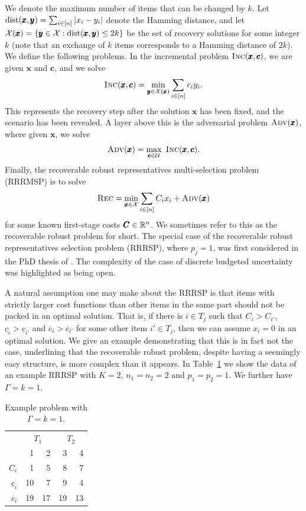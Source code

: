 We denote the maximum number of items that can be changed by $k$.
Let $\operatorname{\text{dist}}(\pmb{x},\pmb{y}) = \sum_{i\in[n]} |x_i-y_i|$ denote the Hamming distance, and let $\mathcal{X}(\pmb{x}) = \{ \pmb{y}\in\mathcal{X} : \operatorname{\text{dist}}(\pmb{x},\pmb{y})\le 2k\}$ be the set of recovery solutions for some integer $k$ (note that an exchange of $k$ items corresponds to a Hamming distance of $2k$).
We define the following problems. In the incremental problem $\textsc{Inc}(\pmb{x},\pmb{c})$, we are given $\pmb{x}$ and $\pmb{c}$, and we solve
\[ \textsc{Inc}(\pmb{x},\pmb{c}) = \min_{\pmb{y}\in \mathcal{X}(\pmb{x})} \sum_{i\in[n]} c_i y_i. \]
This represents the recovery step after the solution $\pmb{x}$ has been fixed, and the scenario has been revealed. A layer above this is the adversarial problem {$\textsc{Adv}(\pmb{x})$}, where given $\pmb{x}$, we solve
\[ \textsc{Adv}(\pmb{x}) = \max_{\pmb{c}\in\mathcal{U}}\ \textsc{Inc}(\pmb{x},\pmb{c}). \]
Finally, the recoverable robust representatives multi-selection problem (RRRMSP) is to solve
\[ \textsc{Rec} = \min_{\pmb{x}\in\mathcal{X}} \sum_{i\in[n]} C_ix_i + \textsc{Adv}(\pmb{x}) \]
for some known first-stage costs $\pmb{C}\in\mathbb{R}^n$.
We sometimes refer to this as the recoverable robust problem for short. The special case of the recoverable robust representatives selection problem (RRRSP), where $p_j=1$,  was first considered in the PhD thesis of \cite{busing2011phd}. The complexity of the case of discrete budgeted uncertainty was highlighted as being open.


A natural assumption one may make about the RRRSP is that items with strictly larger cost functions than other items in the same part should not be packed in an optimal solution. That is, if there is $i\in T_j$ such that $C_i > C_{i'}$, $\underline{c}_i > \underline{c}_{i'}$ and $\overline{c}_i > \overline{c}_{i'}$ for some other item $i'\in T_j$, then we can assume $x_i=0$ in an optimal solution. We give an example demonstrating that this is in fact not the case, underlining that the recoverable robust problem, despite having a seemingly easy structure, is more complex than it appears.
In Table~\ref{tab:example} we show the data of an example RRRSP with $K=2$, $n_1 = n_2 = 2$ and $p_1 = p_2 = 1$. We further have $\Gamma=k=1$. 

\begin{table}[htb]
\begin{center}
\begin{tabular}{r|rr|rr}
 & \multicolumn{2}{c|}{$T_1$} & \multicolumn{2}{c}{$T_2$} \\
 & 1 & 2 & 3 & 4 \\
 \hline
$C_i$ & 1 & 5 & 8 & 7 \\
$\underline{c}_i$ & 10 & 7 & 9 & 4 \\
$\overline{c}_i$ & 19 & 17 & 19 & 13
\end{tabular}
\end{center}
\caption{Example problem with $\Gamma=k=1$.\label{tab:example}}
\end{table}

